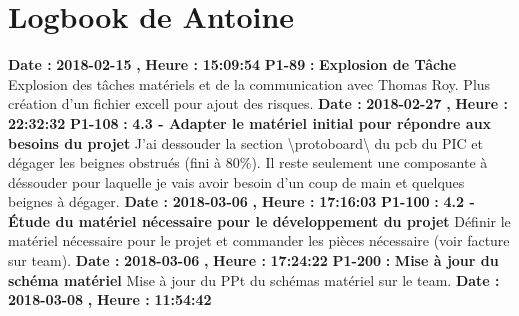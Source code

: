 \documentclass{article}%
\begin{document}
%
\normalsize%
\section{Logbook de Antoine}%
\textbf{Date : }%
\textbf{2018{-}02{-}15}%
\textbf{,}%
\textbf{ Heure : }%
\textbf{15:09:54}%
\newline%
%
\textbf{P1{-}89 }%
\textbf{ : }%
\textbf{ Explosion de Tâche}%
\newline%
\newline%
%
Explosion des tâches matériels et de la communication avec Thomas Roy. Plus création d'un fichier excell pour ajout des risques.\newline%
\newline%
%
\textbf{Date : }%
\textbf{2018{-}02{-}27}%
\textbf{,}%
\textbf{ Heure : }%
\textbf{22:32:32}%
\newline%
%
\textbf{P1{-}108 }%
\textbf{ : }%
\textbf{ 4.3 {-} Adapter le matériel initial pour répondre aux besoins du projet}%
\newline%
\newline%
%
J'ai dessouder la section \textbackslash{}protoboard\textbackslash{} du pcb du PIC et dégager les beignes obstrués (fini à 80\%). Il reste seulement une composante à déssouder pour laquelle je vais avoir besoin d'un coup de main et quelques beignes à dégager.\newline%
\newline%
%
\textbf{Date : }%
\textbf{2018{-}03{-}06}%
\textbf{,}%
\textbf{ Heure : }%
\textbf{17:16:03}%
\newline%
%
\textbf{P1{-}100 }%
\textbf{ : }%
\textbf{ 4.2 {-} Étude du matériel nécessaire pour le développement du projet}%
\newline%
\newline%
%
Définir le matériel nécessaire pour le projet et commander les pièces nécessaire (voir facture sur team). \newline%
\newline%
%
\textbf{Date : }%
\textbf{2018{-}03{-}06}%
\textbf{,}%
\textbf{ Heure : }%
\textbf{17:24:22}%
\newline%
%
\textbf{P1{-}200 }%
\textbf{ : }%
\textbf{ Mise à jour du schéma matériel}%
\newline%
\newline%
%
Mise à jour du PPt du schémas matériel sur le team.\newline%
\newline%
%
\textbf{Date : }%
\textbf{2018{-}03{-}08}%
\textbf{,}%
\textbf{ Heure : }%
\textbf{11:54:42}%
\end{document}
